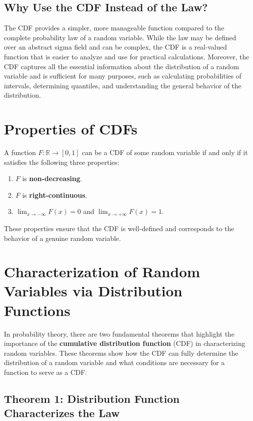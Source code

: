     \subsection{Why Use the CDF Instead of the Law?}
    
    The CDF provides a simpler, more manageable function compared to the complete probability law of a random variable. While the law may be defined over an abstract sigma field and can be complex, the CDF is a real-valued function that is easier to analyze and use for practical calculations. \newline
    Moreover, the CDF captures all the essential information about the distribution of a random variable and is sufficient for many purposes, such as calculating probabilities of intervals, determining quantiles, and understanding the general behavior of the distribution.
    
    \section{Properties of CDFs}
    A function \( F: \mathbb{R} \to [0, 1] \) can be a CDF of some random variable if and only if it satisfies the following three properties:
    \begin{enumerate}
        \item \( F \) is \textbf{non-decreasing}.
        \item \( F \) is \textbf{right-continuous}.
        \item \(\lim_{x \to -\infty} F(x) = 0\) and \(\lim_{x \to +\infty} F(x) = 1\).
    \end{enumerate}
    These properties ensure that the CDF is well-defined and corresponds to the behavior of a genuine random variable.
    
    \section{Characterization of Random Variables via Distribution Functions}
    
    In probability theory, there are two fundamental theorems that highlight the importance of the \textbf{cumulative distribution function} (CDF) in characterizing random variables. These theorems show how the CDF can fully determine the distribution of a random variable and what conditions are necessary for a function to serve as a CDF.
    
    \subsection{Theorem 1: Distribution Function Characterizes the Law}
    
